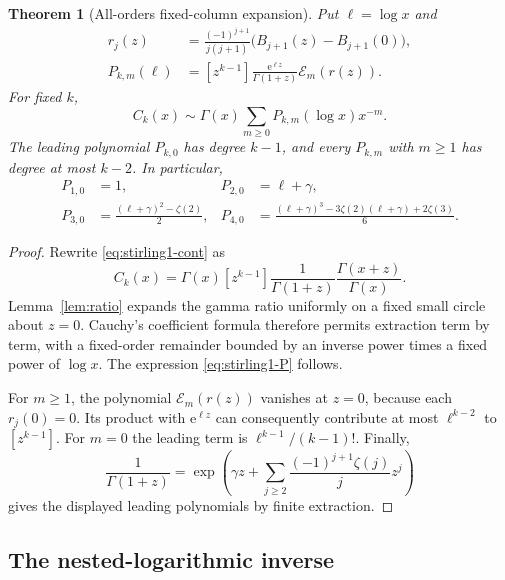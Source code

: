 \documentclass[11pt,a4paper]{article}
\numberwithin{equation}{section}
\newtheorem{theorem}{Theorem}[section]
\theoremstyle{definition}
\theoremstyle{remark}
\newcommand{\ee}{\mathrm e}
\newcommand{\cE}{\mathcal E}
\begin{document}
\begin{theorem}[All-orders fixed-column expansion]
\label{thm:stirling1}
Put $\ell=\log x$ and
\begin{align}
 r_j(z)&=\frac{(-1)^{j+1}}{j(j+1)}
              \bigl(B_{j+1}(z)-B_{j+1}(0)\bigr),\nonumber\\
 P_{k,m}(\ell)&=[z^{k-1}]\frac{\ee^{\ell z}}{\Gamma(1+z)}
                      \cE_m(r(z)).
 \label{eq:stirling1-P}
\end{align}
For fixed $k$,
\begin{equation}
 C_k(x)\sim\Gamma(x)\sum_{m\ge0}P_{k,m}(\log x)x^{-m}.
 \label{eq:stirling1-forward}
\end{equation}
The leading polynomial $P_{k,0}$ has degree $k-1$, and every $P_{k,m}$ with $m\ge1$ has degree at most $k-2$. In particular,
\begin{align}
 P_{1,0}&=1,&P_{2,0}&=\ell+\gamma,\nonumber\\
 P_{3,0}&=\frac{(\ell+\gamma)^2-\zeta(2)}2,&
 P_{4,0}&=\frac{(\ell+\gamma)^3-3\zeta(2)(\ell+\gamma)+2\zeta(3)}6.
 \label{eq:stirling1-leading}
\end{align}
\end{theorem}
\begin{proof}
Rewrite \eqref{eq:stirling1-cont} as
\[
 C_k(x)=\Gamma(x)[z^{k-1}]
        \frac1{\Gamma(1+z)}\frac{\Gamma(x+z)}{\Gamma(x)}.
\]
Lemma~\ref{lem:ratio} expands the gamma ratio uniformly on a fixed small circle about $z=0$. Cauchy's coefficient formula therefore permits extraction term by term, with a fixed-order remainder bounded by an inverse power times a fixed power of $\log x$. The expression \eqref{eq:stirling1-P} follows.

For $m\ge1$, the polynomial $\cE_m(r(z))$ vanishes at $z=0$, because each $r_j(0)=0$. Its product with $\ee^{\ell z}$ can consequently contribute at most $\ell^{k-2}$ to $[z^{k-1}]$. For $m=0$ the leading term is $\ell^{k-1}/(k-1)!$. Finally,
\[
 \frac1{\Gamma(1+z)}
 =\exp\left(\gamma z+\sum_{j\ge2}\frac{(-1)^{j+1}\zeta(j)}jz^j\right)
\]
gives the displayed leading polynomials by finite extraction.
\end{proof}

\subsection{The nested-logarithmic inverse}
\end{document}
